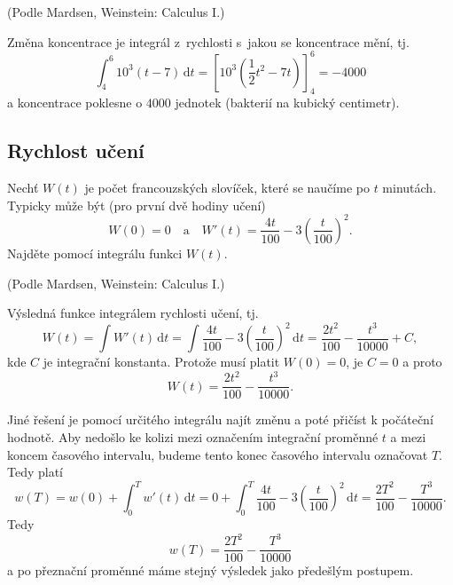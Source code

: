 (Podle Mardsen, Weinstein: Calculus I.)

\reseni
Změna koncentrace je integrál z rychlosti s jakou se koncentrace mění, tj. 
\begin{equation*}
  \int_4^6 10^3(t-7)\,\mathrm dt= \left[10^3\left (\frac 12 t^2-7t\right)\right]_4^6=-4000
\end{equation*}
a koncentrace poklesne o $4000$ jednotek (bakterií na kubický centimetr).
\konec

\stranka


\subsection{Rychlost učení} Nechť $W(t)$ je počet francouzských slovíček,
které se naučíme po $t$ minutách. Typicky může být (pro první dvě hodiny učení)
$$W(0)=0\quad \text {a} \quad W'(t)=\frac{4t}{100}-3\left (\frac  t{100}\right)^2.$$ Najděte pomocí integrálu funkci $W(t)$.

(Podle Mardsen, Weinstein: Calculus I.)

\reseni Výsledná funkce integrálem rychlosti učení, tj.
\begin{equation*}
W(t)=\int W'(t) \,\mathrm dt  =  \int \frac{4t}{100}-3\left (\frac  t{100}\right)^2 \,\mathrm dt  =\frac {2t^2}{100}-\frac{t^3}{10000} +C,
\end{equation*}
kde $C$ je integrační konstanta. Protože musí platit $W(0)=0$, je $C=0$ a proto
\begin{equation*}
  W(t)=\frac {2t^2}{100}-\frac{t^3}{10000}.
\end{equation*}

Jiné řešení je pomocí určitého integrálu najít změnu a poté přičíst k počáteční hodnotě. Aby nedošlo ke kolizi mezi označením integrační proměnné $t$ a mezi koncem časového intervalu, budeme tento konec časového intervalu označovat $T$. Tedy platí
\begin{equation*}
  w(T)=w(0)+\int_0^T w'(t)\,\mathrm dt=
  0+ \int_0^T \frac{4t}{100}-3\left (\frac  t{100}\right)^2 \,\mathrm dt  =\frac {2T^2}{100}-\frac{T^3}{10000}.
\end{equation*}
Tedy
\begin{equation*}
  w(T)=\frac {2T^2}{100}-\frac{T^3}{10000}
\end{equation*}
a po přeznační proměnné máme stejný výsledek jako předešlým postupem.

\konec


\stranka

